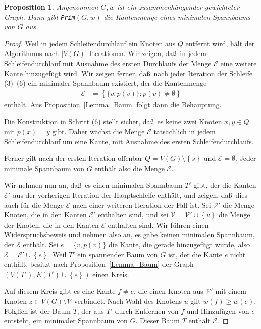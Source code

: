 \documentclass[10pt,reqno]{amsart}
\numberwithin{equation}{section}
\newcommand\cE{\mathcal E}
\newcommand\cV{\mathcal V}
\newtheorem{proposition}[definition]{Proposition}
\newcommand\cbc[1]{\left\{{#1}\right\}}
\newcommand\Prop{Proposition}
\begin{document}
\begin{proposition}\label{prop_prim}
	Angenommen $G,w$ ist ein zusammenh\"angender gewichteter Graph.
	Dann gibt {\tt Prim}$(G,w)$ die Kantenmenge eines minimalen Spannbaums von $G$ aus.
\end{proposition}
\begin{proof}
	Weil in jedem Schleifendurchlauf ein Knoten aus $Q$ entfernt wird, h\"alt der Algorithmus nach $|V(G)|$ Iterationen.
	Wir zeigen, da\ss\ in jedem Schleifendurchlauf mit Ausnahme des ersten Durchlaufs der Menge $\cE$ eine weitere Kante hinzugef\"ugt wird.
	Wir zeigen ferner, da\ss\ nach jeder Iteration der Schleife (3)--(6) ein minimaler Spannbaum existiert, der die Kantenmenge
	\begin{align*}
		\cE&=\cbc{\{v,p(v)\}:p(v)\neq\emptyset}
	\end{align*}
	enth\"alt.
	Aus \Prop~\ref{Lemma_Baum} folgt dann die Behauptung.

	Die Konstruktion in Schritt (6) stellt sicher, da\ss\ es keine zwei Knoten $x,y\in Q$ mit $p(x)=y$ gibt.
	Daher w\"achst die Menge $\cE$ tats\"achlich in jedem Schleifendurchlauf um eine Kante, mit Ausnahme des ersten Schleifendurchlaufs.

	Ferner gilt nach der ersten Iteration offenbar $Q=V(G)\setminus\cbc s$ und $\cE=\emptyset$.
	Jeder minimale Spannbaum von $G$ enth\"alt also die Menge $\cE$.
	
	Wir nehmen nun an, da\ss\ es einen minimalen Spannbaum $T'$ gibt, der die Kanten $\cE'$ aus der vorherigen Iteration der Hauptschleife enth\"alt, und zeigen, da\ss\ dies auch f\"ur die Menge $\cE$ nach einer weiteren Iteration der Fall ist.
	Sei $\cV'$ die Menge Knoten, die in den Kanten $\cE'$ enthalten sind, und sei $\cV=\cV'\cup\cbc v$ die Menge der Knoten, die in den Kanten $\cE$ enthalten sind.
	Wir f\"uhren einen Widerspruchsbeweis und nehmen also an, es g\"abe keinen minimalen Spannbaum, der $\cE$ enth\"alt.
	Sei $e=\{v,p(v)\}$ die Kante, die gerade hinzugef\"ugt wurde, also $\cE=\cE'\cup\cbc e$.
	Weil $T'$ ein spannender Baum von $G$ ist, der die Kante $e$ nicht enth\"alt, besitzt nach \Prop~\ref{Lemma_Baum} der Graph $(V(T'),E(T')\cup\cbc e)$ einen Kreis.

	Auf diesem Kreis gibt es eine Kante $f\neq e$, die einen Knoten aus $\cV'$ mit einem Knoten $z\in V(G)\setminus\cV$ verbindet.
	Nach Wahl des Knotens $u$ gilt $w(f)\geq w(e)$.
	Folglich ist der Baum $T$, der aus $T'$ durch Entfernen von $f$ und Hinzuf\"ugen von $e$ entsteht, ein minimaler Spannbaum von $G$.
	Dieser Baum $T$ enth\"alt $\cE$.
\end{proof}
\end{document}
